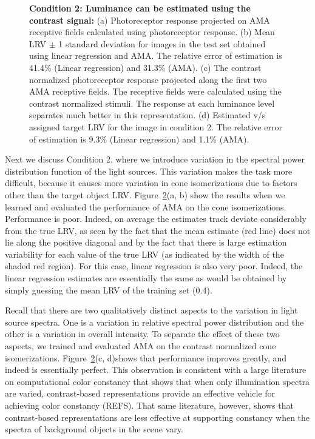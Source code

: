 \documentclass{jov}
\begin{document}
\begin{figure}
\begin{subfigure}[b]{0.22 \textwidth}
        \label{fig:case2RFResponseContrast}
    \end{subfigure}
    \caption{{\bf Condition 2: Luminance can be estimated using the contrast signal:} (a) Photoreceptor response projected on AMA receptive fields calculated using photoreceptor response. (b) Mean LRV $\pm$ 1 standard deviation for images in the test set obtained using linear regression and AMA. The relative error of estimation is 41.4\% (Linear regression) and 31.3\% (AMA). (c) The contrast normalized photoreceptor response projected along the first two AMA receptive fields. The receptive fields were calculated using the contrast normalized stimuli. The response at each luminance level separates much better in this representation. (d) Estimated v/s assigned target LRV for the image in condition 2. The relative error of estimation is 9.3\% (Linear regression) and 1.1\% (AMA).}
\label{fig:Condition2}
\end{figure}

Next we discuss Condition 2, where we introduce variation in the spectral power distribution function of the light sources.
This variation makes the task more difficult, because it causes more variation in cone isomerizations due to factors other than the target object LRV.
Figure~\ref{fig:Condition2}(a, b) show the results when we learned and evaluated the performance of AMA on the cone isomerizations.
Performance is poor.
Indeed, on average the estimates track deviate considerably from the true LRV, as seen by the fact that the mean estimate
(red line) does not lie along the positive diagonal and by the fact that there is large estimation variability for each
value of the true LRV (as indicated by the width of the shaded red region).
For this case, linear regression is also very poor. Indeed, the linear regression estimates are essentially the same as would be obtained
by simply guessing the mean LRV of the training set (0.4).

Recall that there are two qualitatively distinct aspects to the variation in light source spectra.
One is a variation in relative spectral power distribution and the
other is a variation in overall intensity.
To separate the effect of these two aspects, we trained and evaluated AMA on the contrast normalized cone isomerizations.
Figure~\ref{fig:Condition2}(c, d)shows that performance improves greatly, and indeed is essentially perfect.
This observation is consistent with a large literature on computational color constancy that shows that when only illumination spectra are varied,
contrast-based representations provide an effective vehicle for achieving color constancy (REFS).
That same literature, however, shows that
contrast-based representations are less effective at supporting constancy when the spectra of background objects in the scene vary.
\end{document}
